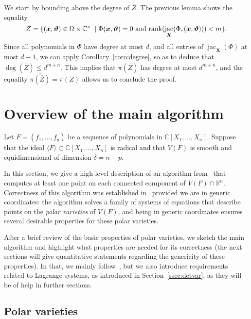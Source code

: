 \documentclass[12pt]{article}
\def\thetab{\bm{\vartheta}}
\def\xb{{\bm x}}
\DeclareMathOperator{\jac}{jac}
\def\dt{s}
\def\C{\mathbb{C}}
\def\R{\mathbb{R}}
\begin{document}
We start by bounding above the degree of $\overline{Z}$.
The previous lemma shows the equality
\[Z = \{ (\xb,\thetab) \in \Omega \times \C^\dt \ \mid \Phi(\xb,\thetab) =0
\text{~and~} {\rm rank}(\jac_{\bm X}(\Phi,(\xb,\thetab))) < m\}.\]
Since all polynomials in $\Phi$ have degree at most $d$, and all
entries of $\jac_{\bm X}(\Phi)$ at most $d-1$, we can apply
Corollary~\ref{coro:degree}, so as to deduce that $\deg(\overline{Z})
\le d^{m+n}$. This implies that $\overline{\pi(\overline Z)}$ has
degree at most $d^{m+n}$, and the equality $\overline{\pi(\overline
  Z)} =\overline{\pi(Z)}$ allows us to conclude the proof.


\section{Overview of the main algorithm}

Let $F = (f_1,\hdots,f_p)$ be a sequence of polynomials in
$\C[X_1,\hdots,X_n]$. Suppose that the ideal $\langle F \rangle
\subset \C[X_1,\hdots,X_n]$ is radical and that $V(F)$ is smooth and
equidimensional of dimension $\delta= n-p$.

In this section, we give a high-level description of an algorithm
from~\cite{EMP} that computes at least one point on each connected
component of $V(F) \cap \R^n$. Correctness of this algorithm was
established in~\cite{EMP} provided we are in generic coordinates: the
algorithm solves a family of systems of equations that describe points
on the {\em polar varieties} of $V(F)$, and being in generic
coordinates ensures several desirable properties for these polar
varieties.

After a brief review of the basic properties of polar varieties, we
sketch the main algorithm and highlight what properties are needed for
its correctness (the next sections will give quantitative statements
regarding the genericity of these properties). In that, we mainly
follow~\cite{EMP}, but we also introduce requirements related to
Lagrange systems, as introduced in Section~\ref{ssec:detvar}, as they
will be of help in further sections.


\subsection{Polar varieties}
\end{document}
